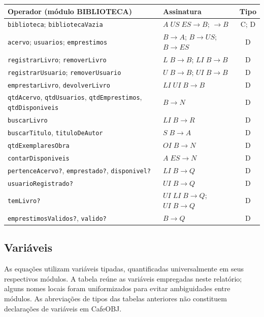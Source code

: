 \documentclass[a4paper,12pt]{article}
\begin{document}
\begin{center}
\small
\begin{tabularx}{\linewidth}{@{}Y l c@{}}
\toprule
Operador (módulo BIBLIOTECA) & Assinatura & Tipo \\
\midrule
\texttt{biblioteca}; \texttt{bibliotecaVazia} & $A\;US\;ES\to B$; $\to B$ & C; D \\
\texttt{acervo}; \texttt{usuarios}; \texttt{emprestimos} & $B\to A$; $B\to US$; $B\to ES$ & D \\
\texttt{registrarLivro}; \texttt{removerLivro} & $L\;B\to B$; $LI\;B\to B$ & D \\
\texttt{registrarUsuario}; \texttt{removerUsuario} & $U\;B\to B$; $UI\;B\to B$ & D \\
\texttt{emprestarLivro}, \texttt{devolverLivro} & $LI\;UI\;B\to B$ & D \\
\texttt{qtdAcervo}, \texttt{qtdUsuarios}, \texttt{qtdEmprestimos}, \texttt{qtdDisponiveis} & $B\to N$ & D \\
\texttt{buscarLivro} & $LI\;B\to R$ & D \\
\texttt{buscarTitulo}, \texttt{tituloDeAutor} & $S\;B\to A$ & D \\
\texttt{qtdExemplaresObra} & $OI\;B\to N$ & D \\
\texttt{contarDisponiveis} & $A\;ES\to N$ & D \\
\texttt{pertenceAcervo?}, \texttt{emprestado?}, \texttt{disponivel?} & $LI\;B\to Q$ & D \\
\texttt{usuarioRegistrado?} & $UI\;B\to Q$ & D \\
\texttt{temLivro?} & $UI\;LI\;B\to Q$; $UI\;B\to Q$ & D \\
\texttt{emprestimosValidos?}, \texttt{valido?} & $B\to Q$ & D \\
\bottomrule
\end{tabularx}
\end{center}

\subsection{Variáveis}

As equações utilizam variáveis tipadas, quantificadas universalmente em seus
respectivos módulos. A tabela reúne as variáveis empregadas neste relatório;
alguns nomes locais foram uniformizados para evitar ambiguidades entre módulos.
As abreviações de tipos das tabelas anteriores não constituem declarações de
variáveis em CafeOBJ.
\end{document}
